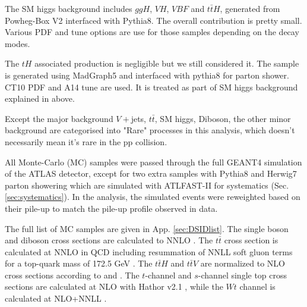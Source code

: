 The SM higgs background includes $ggH$, $VH$, $VBF$ and $t\bar{t}H$, generated from Powheg-Box \cite{Powheg} V2 interfaced with Pythia8. The overall contribution is pretty small. Various PDF and tune options are use for those samples depending on the decay modes.

The $tH$ associated production is negligible but we still considered it. The sample is generated using MadGraph5 and interfaced with pythia8 for parton shower. CT10 PDF and A14 tune are used. It is treated as part of SM higgs background explained in above.

Except the major background $V+$jets, $t\bar{t}$, SM higgs, Diboson, the other minor background are categorised into "Rare" processes in this analysis, which doesn't necessarily mean it's rare in the pp collision.

All Monte-Carlo (MC) samples were passed through the full GEANT4 \cite{GEANT4} simulation of the ATLAS detector, except for two extra \ttbar samples with Pythia8 and Herwig7 \cite{Herwig} parton showering which are simulated with ATLFAST-II \cite{AFII} for systematics (Sec. \ref{sec:systematics}). In the analysis, the simulated events were reweighted based on their pile-up to match the pile-up profile observed in data.

The full list of MC samples are given in App. \ref{sec:DSIDlist}. The single boson and diboson cross sections are calculated to NNLO \cite{bosonXsec}. The $t\bar{t}$ cross section is calculated at NNLO in QCD including resummation of NNLL soft gluon terms for a top-quark mass of 172.5 GeV \cite{ttXsec}. The $t\bar{t}H$ and $t\bar{t}V$ are normalized to NLO cross sections according to \cite{HiggsBR} and \cite{ttVXsec}. The $t$-channel and $s$-channel single top cross sections are calculated at NLO with Hathor v2.1 \cite{Hather1,Hather2}, while the $Wt$ channel is calculated at NLO+NNLL \cite{WtXsec}.

